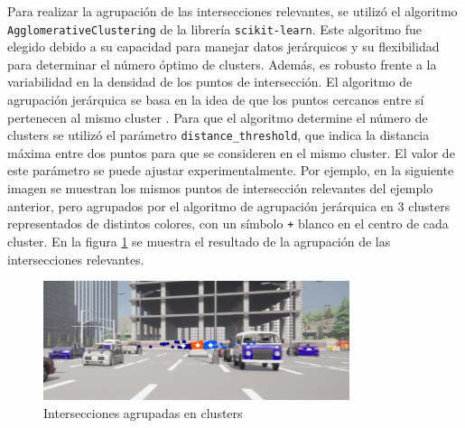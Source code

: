 Para realizar la agrupación de las intersecciones relevantes, se utilizó el algoritmo \texttt{AgglomerativeClustering} de la librería \texttt{scikit-learn}.
Este algoritmo fue elegido debido a su capacidad para manejar datos jerárquicos y su flexibilidad para determinar el número óptimo de clusters. Además,
es robusto frente a la variabilidad en la densidad de los puntos de intersección.
El algoritmo de agrupación jerárquica se basa en la idea de que los puntos cercanos entre sí pertenecen al mismo cluster \cite{tan2005introduction}.
Para que el algoritmo determine el número de clusters se utilizó el parámetro \texttt{distance\_threshold}, que indica la distancia máxima
entre dos puntos para que se consideren en el mismo cluster. El valor de este parámetro se puede ajustar experimentalmente.
Por ejemplo, en la siguiente imagen se muestran los mismos puntos de intersección relevantes del ejemplo anterior,
pero agrupados por el algoritmo de agrupación jerárquica en 3 clusters representados de distintos colores, con un símbolo \texttt{+} blanco en el centro de cada cluster.
En la figura \ref{fig:clusters} se muestra el resultado de la agrupación de las intersecciones relevantes.
\begin{figure}[!ht]
    \centering
    \includegraphics[width=0.8\textwidth]{img/reticule/AgglomerativeClustering}
    \caption{Intersecciones agrupadas en clusters}
    \label{fig:clusters}
\end{figure}



